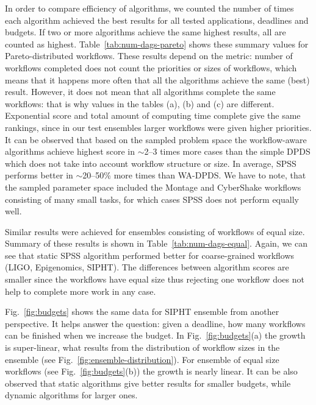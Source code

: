 \documentclass{sig-alternate}
\begin{document}
In order to compare efficiency of algorithms, we counted the number of times
each algorithm achieved the best results for all tested applications, deadlines
and budgets. If two or more algorithms achieve the same highest results, all are
counted as highest. Table~\ref{tab:num-dags-pareto} shows these summary values
for Pareto-distributed workflows. These results depend on the metric: number of
workflows completed does not count the priorities or sizes of workflows, which
means that it happens more often that all the algorithms achieve the same (best)
result. However, it does not mean that all algorithms complete the same
workflows: that is why values in the tables (a), (b) and (c) are different.
Exponential score and total amount of computing time complete give the same
rankings, since in our test ensembles larger workflows were given higher
priorities. It can be observed that based on the sampled problem space the
workflow-aware algorithms achieve highest score in $\sim$2--3 times more cases
than the simple DPDS which does not take into account workflow structure or
size. In average, SPSS performs better in $\sim$20--50\% more times than
WA-DPDS. We have to note, that the sampled parameter space included the Montage
and CyberShake workflows consisting of many small tasks, for which cases SPSS
does not perform equally well.


Similar results were achieved for ensembles consisting of workflows of equal
size. Summary of these results is shown in Table~\ref{tab:num-dags-equal}.
Again, we can see that static SPSS algorithm performed better for coarse-grained
workflows (LIGO, Epigenomics, SIPHT). The differences between algorithm scores
are smaller since the workflows have equal size thus rejecting one workflow
does not help to complete more work in any case.
               
               
Fig.~\ref{fig:budgets} shows the same data for SIPHT ensemble from another
perspective. It helps answer the question: given a deadline, how many workflows
can be finished when we increase the budget. In Fig.~\ref{fig:budgets}(a) the
growth is super-linear, what results from the distribution of workflow sizes in
the ensemble (see Fig.~\ref{fig:ensemble-distribution}). For ensemble of equal
size workflows (see Fig.~\ref{fig:budgets}(b)) the growth is nearly linear. It
can be also observed that static algorithms give better results for smaller
budgets, while dynamic algorithms for larger ones.
\end{document}
